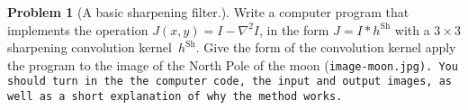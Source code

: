 \documentclass[11pt]{article}
\theoremstyle{plain}
\theoremstyle{definition}
\newtheorem{problem}{Problem}
\theoremstyle{remark}
\begin{document}
\begin{problem}[A basic sharpening filter.]
Write a computer program that implements the operation 
$J(x,y)=I-\nabla^2 I$, in the form $J=I\ast h^{\mathrm{Sh}}$ with
a $3\times 3$ sharpening convolution kernel~$h^{\mathrm{Sh}}$. Give the form of the convolution kernel
apply the program to the image of the
North Pole of the moon (\tt image-moon.jpg\rm). You should turn in the the computer code, the input and output images, as well
as a short explanation of why the method works. 
\end{problem}
\end{document}
